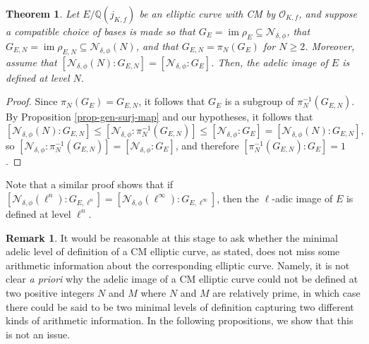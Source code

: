 \documentclass[11pt]{amsart}
\newtheorem{theorem}[defn]{Theorem}
\theoremstyle{definition}
\newtheorem{remark}[defn]{Remark}
\newcommand{\Q}{\mathbb{Q}}
\newcommand{\Of}{\mathcal{O}_{K,f}}
\DeclareMathOperator{\im}{im}  %
\begin{document}
\begin{theorem}\label{thm-levelofdef}
    Let $E/\Q(j_{K,f})$ be an elliptic curve with CM by $\Of$, and suppose a compatible choice of bases is made so that $G_{E} = \im \rho_{E} \subseteq \mathcal{N}_{\delta, \phi}$, that $G_{E, N} = \im \rho_{E, N} \subseteq \mathcal{N}_{\delta, \phi}(N)$, and that $G_{E,N} = \pi_{N}(G_{E})$ for $N \geq 2$. Moreover, assume that $[\mathcal{N}_{\delta, \phi}(N) : G_{E, N}] = [\mathcal{N}_{\delta, \phi} : G_{E}]$. Then, the adelic image of $E$ is defined at level $N$.
\end{theorem}

\begin{proof}
   Since $\pi_N(G_E)=G_{E,N}$, it follows that $G_{E}$ is a subgroup of $\pi_{N}^{-1}(G_{E, N})$. By Proposition \ref{prop-gen-surj-map} and our hypotheses, it follows that 
    \[ [\mathcal{N}_{\delta, \phi}(N) : G_{E, N}] \leq [\mathcal{N}_{\delta, \phi} : \pi_{N}^{-1}(G_{E, N})] \leq [\mathcal{N}_{\delta, \phi} : G_{E}] = [\mathcal{N}_{\delta, \phi}(N) : G_{E, N}],  \]
    so $[\mathcal{N}_{\delta, \phi} : \pi_{N}^{-1}(G_{E, N})] = [\mathcal{N}_{\delta, \phi} : G_{E}]$, and therefore $[\pi_{N}^{-1}(G_{E, N}) : G_{E}] = 1$.
\end{proof}

Note that a similar proof shows that if $[\mathcal{N}_{\delta, \phi}(\ell^n) : G_{E, \ell^n}] = [\mathcal{N}_{\delta, \phi}(\ell^{\infty}) : G_{E, \ell^{\infty}}]$, then the $\ell$-adic image of $E$ is defined at level $\ell^n$.



\begin{remark}
    It would be reasonable at this stage to ask whether the minimal adelic level of definition of a CM elliptic curve, as stated, does not miss some arithmetic information about the corresponding elliptic curve. Namely, it is not clear \textit{a priori} why the adelic image of a CM elliptic curve could not be defined at two positive integers $N$ and $M$ where $N$ and $M$ are relatively prime, in which case there could be said to be two minimal levels of definition capturing two different kinds of arithmetic information. In the following propositions, we show that this is not an issue.
\end{remark}
\end{document}
